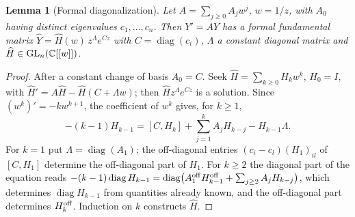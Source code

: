 \documentclass[11pt]{article}
\numberwithin{equation}{section}
\newtheorem{lemma}[theorem]{Lemma}
\theoremstyle{definition}
\theoremstyle{remark}
\newcommand{\C}{\mathbb C}\newcommand{\Q}{\mathbb Q}\newcommand{\R}{\mathbb R}\newcommand{\Z}{\mathbb Z}
\begin{document}
\begin{lemma}[Formal diagonalization]\label{lem:formal}
Let $A=\sum_{j\ge0}A_jw^j$, $w=1/z$, with $A_0$ having distinct eigenvalues
$c_1,\dots,c_n$. Then $Y'=AY$ has a formal fundamental matrix
$\widehat Y=\widehat H(w)\,z^{\Lambda}e^{Cz}$ with $C=\operatorname{diag}(c_i)$,
$\Lambda$ a constant diagonal matrix and $\widehat H\in\GL_n(\C[[w]])$.
\end{lemma}
\begin{proof}
After a constant change of basis $A_0=C$. Seek $\widehat H=\sum_{k\ge0}H_kw^k$,
$H_0=I$, with $\widehat H'=A\widehat H-\widehat H(C+\Lambda w)$; then
$\widehat Hz^\Lambda e^{Cz}$ is a solution. Since $(w^k)'=-kw^{k+1}$, the
coefficient of $w^k$ gives, for $k\ge1$,
\[
 -(k-1)H_{k-1}=[C,H_k]+\sum_{j=1}^kA_jH_{k-j}-H_{k-1}\Lambda .
\]
For $k=1$ put $\Lambda=\operatorname{diag}(A_1)$; the off-diagonal entries
$(c_i-c_l)(H_1)_{il}$ of $[C,H_1]$ determine the off-diagonal part of $H_1$.
For $k\ge2$ the diagonal part of the equation reads
$-(k-1)\operatorname{diag}H_{k-1}=\operatorname{diag}\bigl(A_1^{\rm off}H_{k-1}^{\rm off}
+\sum_{j\ge2}A_jH_{k-j}\bigr)$, which determines $\operatorname{diag}H_{k-1}$ from
quantities already known, and the off-diagonal part determines
$H_k^{\rm off}$. Induction on $k$ constructs $\widehat H$.
\end{proof}
\end{document}
